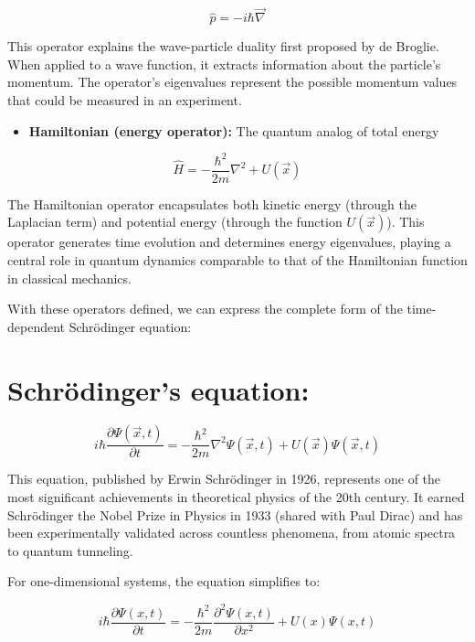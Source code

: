 \documentclass[italian]{HKNdocument}
\begin{document}
\begin{equation}
\hat{p}=-i \hbar \vec{\nabla} \label{eq:1.13}
\end{equation}

This operator explains the wave-particle duality first proposed by de Broglie. When applied to a wave function, it extracts information about the particle's momentum. The operator's eigenvalues represent the possible momentum values that could be measured in an experiment.

\begin{itemize}
  \item \textbf{Hamiltonian (energy operator):} The quantum analog of total energy
\end{itemize}

\begin{equation}
\hat{H}=-\frac{\hbar^{2}}{2 m} \nabla^{2}+U(\vec{x}) \label{eq:1.14}
\end{equation}

The Hamiltonian operator encapsulates both kinetic energy (through the Laplacian term) and potential energy (through the function $U(\vec{x})$). This operator generates time evolution and determines energy eigenvalues, playing a central role in quantum dynamics comparable to that of the Hamiltonian function in classical mechanics.

With these operators defined, we can express the complete form of the time-dependent Schrödinger equation:

\section{Schrödinger's equation:}

\begin{equation}
i \hbar \frac{\partial \Psi(\vec{x}, t)}{\partial t}=-\frac{\hbar^{2}}{2 m} \nabla^{2} \Psi(\vec{x}, t)+U(\vec{x}) \Psi(\vec{x}, t) \label{eq:1.15}
\end{equation}

This equation, published by Erwin Schrödinger in 1926, represents one of the most significant achievements in theoretical physics of the 20th century. It earned Schrödinger the Nobel Prize in Physics in 1933 (shared with Paul Dirac) and has been experimentally validated across countless phenomena, from atomic spectra to quantum tunneling.

For one-dimensional systems, the equation simplifies to:

\begin{equation}
i \hbar \frac{\partial \Psi(x, t)}{\partial t}=-\frac{\hbar^{2}}{2 m} \frac{\partial^{2} \Psi(x, t)}{\partial x^{2}}+U(x) \Psi(x, t) \label{eq:1.16}
\end{equation}
\end{document}
